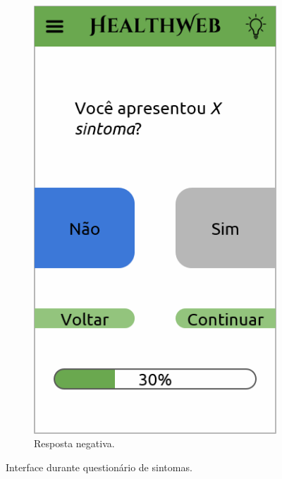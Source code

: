 \begin{figure}[htbp]
\begin{subfigure}{0.24\linewidth}
		\includegraphics[width=\linewidth]{figure/prototype/mobile/symptom_no.png}
		\caption{Resposta negativa.}
		\label{fig:mobile:symptom_no}
	\end{subfigure}
	\hspace{0.11\linewidth}
	\hfill
	\caption{Interface durante questionário de sintomas.}
	\label{fig:mobile:symptom_yes_no}
\end{figure}

